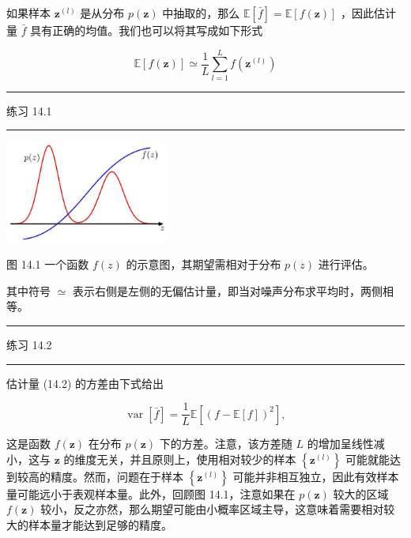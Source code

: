 \documentclass[10pt]{report}
\newcommand{\HRule}{\begin{center}\rule{0.9\linewidth}{0.2mm}\end{center}}
\begin{document}
如果样本 \({\mathbf{z}}^{\left( l\right) }\) 是从分布 \(p\left( \mathbf{z}\right)\) 中抽取的，那么 \(\mathbb{E}\left\lbrack  \bar{f}\right\rbrack   = \mathbb{E}\left\lbrack  {f\left( \mathbf{z}\right) }\right\rbrack\) ，因此估计量 \(\bar{f}\) 具有正确的均值。我们也可以将其写成如下形式

\[
\mathbb{E}\left\lbrack  {f\left( \mathbf{z}\right) }\right\rbrack   \simeq  \frac{1}{L}\mathop{\sum }\limits_{{l = 1}}^{L}f\left( {\mathbf{z}}^{\left( l\right) }\right)  \tag{14.3}
\]

\HRule

练习 14.1

\HRule

\begin{center}
\includegraphics[max width=0.4\textwidth]{images/0194e279-9b28-703a-88f4-c3ac21e2010d_449_1008_1629_543_343_0.jpg}
\end{center}
\hspace*{3em} 

图 14.1 一个函数 \(f\left( z\right)\) 的示意图，其期望需相对于分布 \(p\left( z\right)\) 进行评估。

其中符号 \(\simeq\) 表示右侧是左侧的无偏估计量，即当对噪声分布求平均时，两侧相等。

\HRule

练习 14.2

\HRule

估计量 (14.2) 的方差由下式给出

\[
\operatorname{var}\left\lbrack  \bar{f}\right\rbrack   = \frac{1}{L}\mathbb{E}\left\lbrack  {\left( f - \mathbb{E}\left\lbrack  f\right\rbrack  \right) }^{2}\right\rbrack  , \tag{14.4}
\]

这是函数 \(f\left( \mathbf{z}\right)\) 在分布 \(p\left( \mathbf{z}\right)\) 下的方差。注意，该方差随 \(L\) 的增加呈线性减小，这与 \(\mathbf{z}\) 的维度无关，并且原则上，使用相对较少的样本 \(\left\{  {\mathbf{z}}^{\left( l\right) }\right\}\) 可能就能达到较高的精度。然而，问题在于样本 \(\left\{  {\mathbf{z}}^{\left( l\right) }\right\}\) 可能并非相互独立，因此有效样本量可能远小于表观样本量。此外，回顾图 14.1，注意如果在 \(p\left( \mathbf{z}\right)\) 较大的区域 \(f\left( \mathbf{z}\right)\) 较小，反之亦然，那么期望可能由小概率区域主导，这意味着需要相对较大的样本量才能达到足够的精度。
\end{document}
